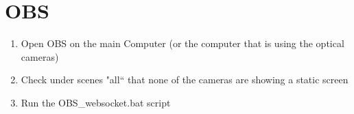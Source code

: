 \section{OBS}
\begin{enumerate}
    \item Open OBS on the main Computer (or the computer that is using the optical cameras)
    \item Check under scenes "all`` that none of the cameras are showing a static screen
    \item Run the OBS\_websocket.bat script
\end{enumerate}
